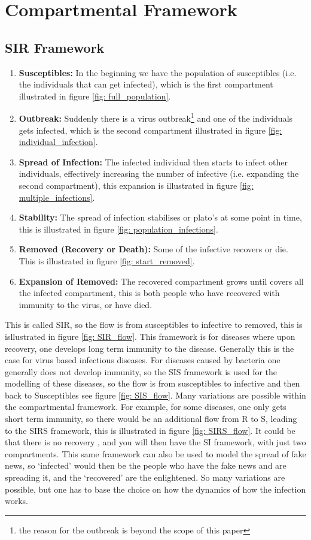 \documentclass[fontsize=17pt]{article}
\begin{document}
\section{Compartmental Framework}
\subsection{SIR Framework}

\begin{enumerate}
	\item \textbf{Susceptibles:} In the beginning we have the population of susceptibles (i.e. the individuals that can get infected), which is the first compartment illustrated in figure \ref{fig: full_population}. 
	\item \textbf{Outbreak:} Suddenly there is a virus outbreak\footnote{the reason for the outbreak is beyond the scope of this paper} and one of the individuals gets infected, which is the second compartment illustrated in figure \ref{fig: individual_infection}. 
	\item \textbf{Spread of Infection:} The infected individual then starts to infect other individuals, effectively increasing the number of infective (i.e. expanding the second compartment), this expansion is illustrated in figure \ref{fig: multiple_infections}.
	\item \textbf{Stability:} The spread of infection stabilises or plato's at some point in time, this is illustrated in figure \ref{fig: population_infections}.
	\item \textbf{Removed (Recovery or Death): }Some of the infective recovers or die. This is illustrated in figure \ref{fig: start_removed}.
	\item \textbf{Expansion of Removed: }The recovered compartment grows until covers all the infected compartment, this is both people who have recovered with immunity to the virus, or have died.
	
\end{enumerate}

This is called SIR, so the flow is from susceptibles to infective to removed, this is isllustrated in figure \ref{fig: SIR_flow}. This framework is for diseases where upon recovery, one develops long term immunity to the disease. Generally this is the case for virus based infectious diseases. For diseases caused by bacteria one generally does not develop immunity, so the SIS framework is used for the modelling of these diseases, so the flow is from susceptibles to infective and then back to Susceptibles see figure \ref{fig: SIS_flow}.
Many variations are possible within the compartmental framework. For example, for some diseases, one only gets short term immunity, so there would be an additional flow from R to S, leading to the SIRS framework, this is illustrated in figure \ref{fig: SIRS_flow}. It could be that there is no recovery , and you will then have the SI framework, with just two compartments. This same framework can also be used to model the spread of fake news, so `infected' would then be the people who have the fake news and are spreading it, and the `recovered' are the enlightened. So many variations are possible, but one has to base the choice on how the dynamics of how the infection works.
\end{document}
